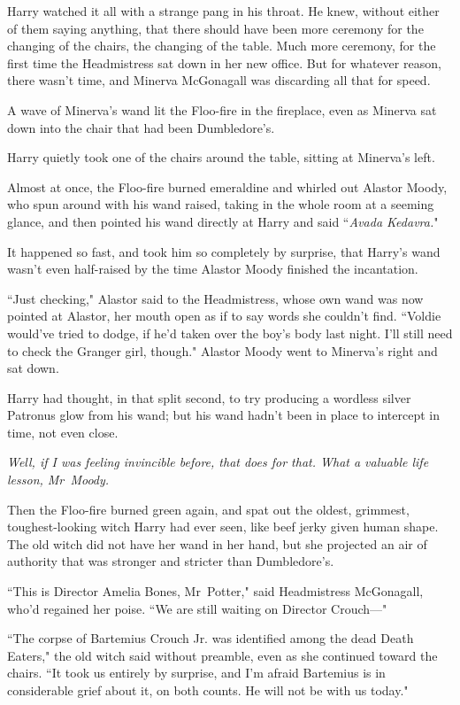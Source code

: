Harry watched it all with a strange pang in his throat. He knew, without either of them saying anything, that there should have been more ceremony for the changing of the chairs, the changing of the table. Much more ceremony, for the first time the Headmistress sat down in her new office. But for whatever reason, there wasn't time, and Minerva McGonagall was discarding all that for speed.

A wave of Minerva's wand lit the Floo-fire in the fireplace, even as Minerva sat down into the chair that had been Dumbledore's.

Harry quietly took one of the chairs around the table, sitting at Minerva's left.

Almost at once, the Floo-fire burned emeraldine and whirled out Alastor Moody, who spun around with his wand raised, taking in the whole room at a seeming glance, and then pointed his wand directly at Harry and said ``\emph{Avada Kedavra.}"

It happened so fast, and took him so completely by surprise, that Harry's wand wasn't even half-raised by the time Alastor Moody finished the incantation.

``Just checking," Alastor said to the Headmistress, whose own wand was now pointed at Alastor, her mouth open as if to say words she couldn't find. ``Voldie would've tried to dodge, if he'd taken over the boy's body last night. I'll still need to check the Granger girl, though." Alastor Moody went to Minerva's right and sat down.

Harry had thought, in that split second, to try producing a wordless silver Patronus glow from his wand; but his wand hadn't been in place to intercept in time, not even close.

\emph{Well, if I was feeling invincible before, that does for that. What a valuable life lesson, Mr~Moody.}

Then the Floo-fire burned green again, and spat out the oldest, grimmest, toughest-looking witch Harry had ever seen, like beef jerky given human shape. The old witch did not have her wand in her hand, but she projected an air of authority that was stronger and stricter than Dumbledore's.

``This is Director Amelia Bones, Mr~Potter," said Headmistress McGonagall, who'd regained her poise. ``We are still waiting on Director Crouch—"

``The corpse of Bartemius Crouch Jr. was identified among the dead Death Eaters," the old witch said without preamble, even as she continued toward the chairs. ``It took us entirely by surprise, and I'm afraid Bartemius is in considerable grief about it, on both counts. He will not be with us today."

